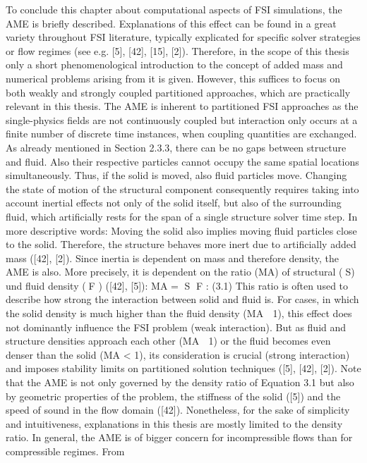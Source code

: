 To conclude this chapter about computational aspects of FSI simulations, the AME is briefly described.
Explanations of this effect can be found in a great variety throughout FSI literature, typically explicated
for specific solver strategies or flow regimes (see e.g. [5], [42], [15], [2]). Therefore, in the scope of
this thesis only a short phenomenological introduction to the concept of added mass and numerical
problems arising from it is given. However, this suffices to focus on both weakly and strongly coupled partitioned approaches, which are practically relevant in this thesis. The AME is inherent to partitioned
FSI approaches as the single-physics fields are not continuously coupled but interaction only occurs at a
finite number of discrete time instances, when coupling quantities are exchanged.
As already mentioned in Section 2.3.3, there can be no gaps between structure and fluid. Also their
respective particles cannot occupy the same spatial locations simultaneously. Thus, if the solid is moved,
also fluid particles move. Changing the state of motion of the structural component consequently requires
taking into account inertial effects not only of the solid itself, but also of the surrounding fluid, which
artificially rests for the span of a single structure solver time step. In more descriptive words: Moving the
solid also implies moving fluid particles close to the solid. Therefore, the structure behaves more inert
due to artificially added mass ([42], [2]). Since inertia is dependent on mass and therefore density, the
AME is also. More precisely, it is dependent on the ratio (MA) of structural (S) und fluid density (F )
([42], [5]):
MA =
S
F
: (3.1)
This ratio is often used to describe how strong the interaction between solid and fluid is. For cases, in
which the solid density is much higher than the fluid density (MA  1), this effect does not dominantly
influence the FSI problem (weak interaction). But as fluid and structure densities approach each other
(MA  1) or the fluid becomes even denser than the solid (MA < 1), its consideration is crucial (strong
interaction) and imposes stability limits on partitioned solution techniques ([5], [42], [2]). Note that the
AME is not only governed by the density ratio of Equation 3.1 but also by geometric properties of the
problem, the stiffness of the solid ([5]) and the speed of sound in the flow domain ([42]). Nonetheless,
for the sake of simplicity and intuitiveness, explanations in this thesis are mostly limited to the density
ratio.
In general, the AME is of bigger concern for incompressible flows than for compressible regimes. From
